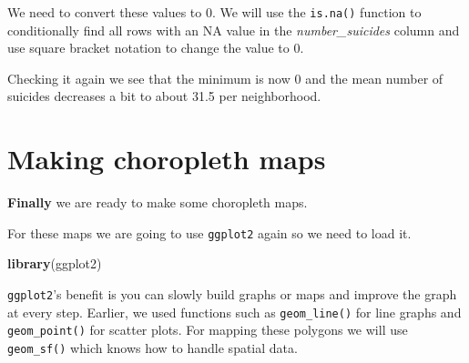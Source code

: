 \documentclass[
  12pt,
]{book}
\newenvironment{Shaded}{\begin{snugshade}}{\end{snugshade}}
\newcommand{\CommentTok}[1]{\textcolor[rgb]{0.56,0.35,0.01}{\textit{#1}}}
\newcommand{\DecValTok}[1]{\textcolor[rgb]{0.00,0.00,0.81}{#1}}
\newcommand{\KeywordTok}[1]{\textcolor[rgb]{0.13,0.29,0.53}{\textbf{#1}}}
\newcommand{\NormalTok}[1]{#1}
\newcommand{\OperatorTok}[1]{\textcolor[rgb]{0.81,0.36,0.00}{\textbf{#1}}}
\newcommand{\StringTok}[1]{\textcolor[rgb]{0.31,0.60,0.02}{#1}}
\begin{document}
We need to convert these values to 0. We will use the \texttt{is.na()} function to conditionally find all rows with an NA value in the \emph{number\_suicides} column and use square bracket notation to change the value to 0.

\begin{Shaded}
\end{Shaded}

Checking it again we see that the minimum is now 0 and the mean number of suicides decreases a bit to about 31.5 per neighborhood.

\begin{Shaded}
\end{Shaded}

\hypertarget{making-choropleth-maps}{%
\section{Making choropleth maps}\label{making-choropleth-maps}}

\textbf{Finally} we are ready to make some choropleth maps.

For these maps we are going to use \texttt{ggplot2} again so we need to load it.

\begin{Shaded}
\begin{Highlighting}[]
\KeywordTok{library}\NormalTok{(ggplot2)}
\end{Highlighting}
\end{Shaded}

\texttt{ggplot2}'s benefit is you can slowly build graphs or maps and improve the graph at every step. Earlier, we used functions such as \texttt{geom\_line()} for line graphs and \texttt{geom\_point()} for scatter plots. For mapping these polygons we will use \texttt{geom\_sf()} which knows how to handle spatial data.
\end{document}
